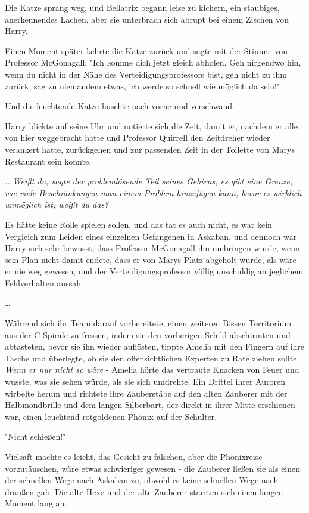 {Die Katze sprang weg, und Bellatrix begann leise zu kichern, ein staubiges, anerkennendes Lachen, aber sie unterbrach sich abrupt bei einem Zischen von Harry.

Einen Moment später kehrte die Katze zurück und sagte mit der Stimme von Professor McGonagall: "Ich komme dich jetzt gleich abholen. Geh nirgendwo hin, wenn du nicht in der Nähe des Verteidigungsprofessors bist, geh nicht zu ihm zurück, sag zu niemandem etwas, ich werde so schnell wie möglich da sein!"

Und die leuchtende Katze huschte nach vorne und verschwand.

Harry blickte auf seine Uhr und notierte sich die Zeit, damit er, nachdem er alle von hier weggebracht hatte und Professor Quirrell den Zeitdreher wieder verankert hatte, zurückgehen und zur passenden Zeit in der Toilette von Marys Restaurant sein konnte.

\emph{.. Weißt du, sagte der problemlösende Teil seines Gehirns, es gibt eine Grenze, wie viele Beschränkungen man einem Problem hinzufügen kann, bevor es wirklich unmöglich ist, weißt du das?}

Es hätte keine Rolle spielen sollen, und das tat es auch nicht, es war kein Vergleich zum Leiden eines einzelnen Gefangenen in Askaban, und dennoch war Harry sich sehr bewusst, dass Professor McGonagall ihn umbringen würde, wenn sein Plan nicht damit endete, dass er von Marys Platz abgeholt wurde, als wäre er nie weg gewesen, und der Verteidigungsprofessor völlig unschuldig an jeglichem Fehlverhalten aussah.

…

Während sich ihr Team darauf vorbereitete, einen weiteren Bissen Territorium aus der C-Spirale zu fressen, indem sie den vorherigen Schild abschirmten und abtasteten, bevor sie ihn wieder auflösten, tippte Amelia mit den Fingern auf ihre Tasche und überlegte, ob sie den offensichtlichen Experten zu Rate ziehen sollte. \emph{Wenn er nur nicht so wäre} - Amelia hörte das vertraute Knacken von Feuer und wusste, was sie sehen würde, als sie sich umdrehte. Ein Drittel ihrer Auroren wirbelte herum und richtete ihre Zauberstäbe auf den alten Zauberer mit der Halbmondbrille und dem langen Silberbart, der direkt in ihrer Mitte erschienen war, einen leuchtend rotgoldenen Phönix auf der Schulter.

"Nicht schießen!"

Vielsaft machte es leicht, das Gesicht zu fälschen, aber die Phönixreise vorzutäuschen, wäre etwas schwieriger gewesen - die Zauberer ließen sie als einen der schnellen Wege nach Askaban zu, obwohl es keine schnellen Wege nach draußen gab. Die alte Hexe und der alte Zauberer starrten sich einen langen Moment lang an.

}
